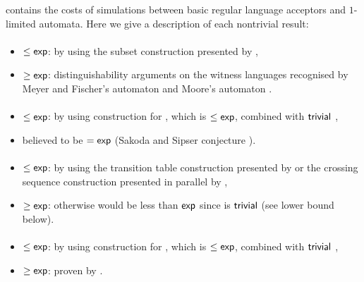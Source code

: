  contains the costs of simulations between basic regular language acceptors and $1$-limited automata.
Here we give a description of each nontrivial result:
\paragraph{\ONFA{}\tto\ODFA}\label{cost:1NFAto1DFA}
\begin{itemize}
	\item $\le\mathsf{exp}$: by using the subset construction presented by ,
	\item $\ge\mathsf{exp}$: distinguishability arguments on the witness languages recognised by Meyer and Fischer's automaton \cite{MeyFis71} and Moore's automaton \cite{Moo71}.
\end{itemize}
\paragraph{\ONFA{}\tto\TDFA}
\begin{itemize}
	\item $\le\mathsf{exp}$: by using construction for \hyperref[cost:1NFAto1DFA]{\ONFA{}\tto\ODFA}, which is $\le\mathsf{exp}$, combined with $\mathsf{trivial}$ \ODFA{}\tto\TDFA,
	\item believed to be $=\mathsf{exp}$ (Sakoda and Sipser conjecture \cite{SakSip78}).
\end{itemize}
\paragraph{\TDFA{}\tto\ODFA}\label{cost:2DFAto1DFA}
\begin{itemize}
	\item $\le\mathsf{exp}$: by using the transition table construction presented by  or the crossing sequence construction presented in parallel by ,
	\item $\ge\mathsf{exp}$: otherwise \hyperref[cost:2DFAto1NFA]{\TDFA{}\tto\ONFA} would be less than $\mathsf{exp}$ since \ODFA{}\tto\ONFA is $\mathsf{trivial}$ (see lower bound below).
\end{itemize}
\paragraph{\TDFA{}\tto\ONFA}\label{cost:2DFAto1NFA}
\begin{itemize}
	\item $\le\mathsf{exp}$: by using construction for \hyperref[cost:2DFAto1DFA]{\TDFA{}\tto\ODFA}, which is $\le\mathsf{exp}$, combined with $\mathsf{trivial}$ \ODFA{}\tto\ONFA,
	\item $\ge\mathsf{exp}$: proven by .
\end{itemize}
